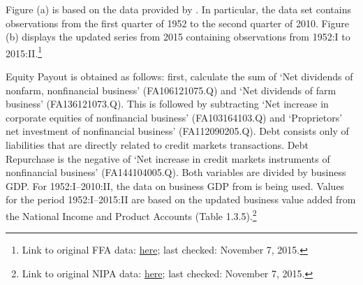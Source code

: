 \documentclass[11pt,a4paper,leqno]{article}
\begin{document}
Figure (a) is based on the data provided by \citeauthor{JERMANNfinancial}. In particular, the data set contains observations from the first quarter of 1952 to the second quarter of 2010. Figure (b) displays the updated series from 2015 containing observations from 1952:I to 2015:II.\footnote{Link to original FFA data: \href{http://www.federalreserve.gov/datadownload/Download.aspx?rel=Z1&series=6215a816d08cd7918c39d61f83656f4d&filetype=spreadsheetml&label=include&layout=seriescolumn&from=03/01/1952&to=06/30/2015}{here}; last checked: November 7, 2015.}

Equity Payout is obtained as follows: first, calculate the sum of ‘Net dividends of nonfarm, nonfinancial business’ (FA106121075.Q) and ‘Net dividends of farm business’ (FA136121073.Q). This is followed by subtracting ‘Net increase in corporate equities of nonfinancial business’ (FA103164103.Q) and ‘Proprietors’ net investment of nonfinancial business’ (FA112090205.Q). Debt consists only of liabilities that are directly related to credit markets transactions.  Debt Repurchase is the negative of ‘Net increase in credit markets instruments of nonfinancial business’ (FA144104005.Q).
Both variables are divided by business GDP. For 1952:I--2010:II, the data on business GDP from \citeauthor{JERMANNfinancial} is being used. Values for the period 1952:I--2015:II are based on the updated business value added from the National Income and Product Accounts (Table 1.3.5).\footnote{Link to original NIPA data: \href{http://www.bea.gov//national/nipaweb/DownSS2.asp}{here}; last checked: November 7, 2015.} 


\vfill
{}




\end{document}
